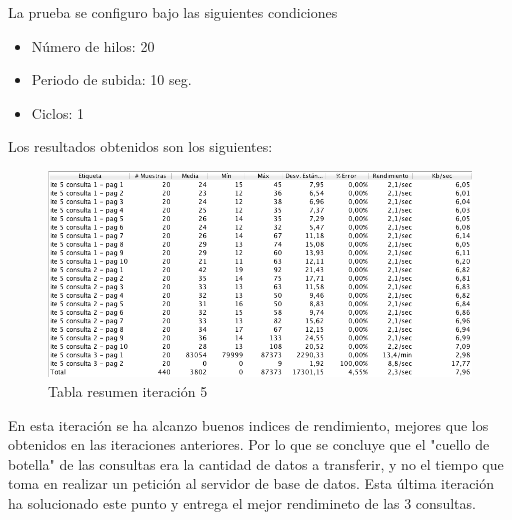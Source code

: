 La prueba se configuro bajo las siguientes condiciones

\begin{itemize}
	\item Número de hilos: 20
	\item Periodo de subida: 10 seg.
	\item Ciclos: 1
\end{itemize}

Los resultados obtenidos son los siguientes:

\begin{figure}[htb]
	\label{Figura14}
	\begin{center}
		\includegraphics[scale=0.6]{imagenes/ite5.png}
		\caption{Tabla resumen iteración 5}
	\end{center}
\end{figure}

En esta iteración se ha alcanzo buenos indices de rendimiento, mejores que los obtenidos en las iteraciones anteriores. Por lo que se concluye que el "cuello de botella" de las consultas era la cantidad de datos a transferir, y no el tiempo que toma en realizar un petición al servidor de base de datos. Esta última iteración ha solucionado este punto y entrega el mejor rendimineto de las 3 consultas.


